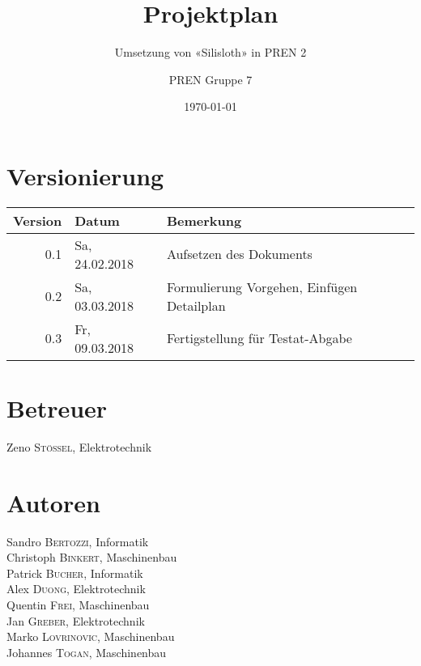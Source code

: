 \author{PREN Gruppe 7}
\title{Projektplan}
\subtitle{Umsetzung von «Silisloth» in PREN 2}
\date{\today}
\maketitle

\section*{Versionierung}
\def\arraystretch{1.2}
\begin{tabularx}{\textwidth}{|r|l|X|}
\hline
\textbf{Version} & \textbf{Datum} & \textbf{Bemerkung} \\
\hline
0.1 & Sa, 24.02.2018 & Aufsetzen des Dokuments \\
0.2 & Sa, 03.03.2018 & Formulierung Vorgehen, Einfügen Detailplan \\
0.3 & Fr, 09.03.2018 & Fertigstellung für Testat-Abgabe \\
\hline
\end{tabularx}
\vspace{1em}

\begin{multicols}{2}
\section*{Betreuer}
Zeno \textsc{Stössel}, Elektrotechnik
\vfill\null
\columnbreak
\section*{Autoren}
Sandro \textsc{Bertozzi}, Informatik \\
Christoph \textsc{Binkert}, Maschinenbau \\
Patrick \textsc{Bucher}, Informatik \\
Alex \textsc{Duong}, Elektrotechnik \\
Quentin \textsc{Frei}, Maschinenbau \\
Jan \textsc{Greber}, Elektrotechnik \\
Marko \textsc{Lovrinovic}, Maschinenbau \\
Johannes \textsc{Togan}, Maschinenbau
\end{multicols}

